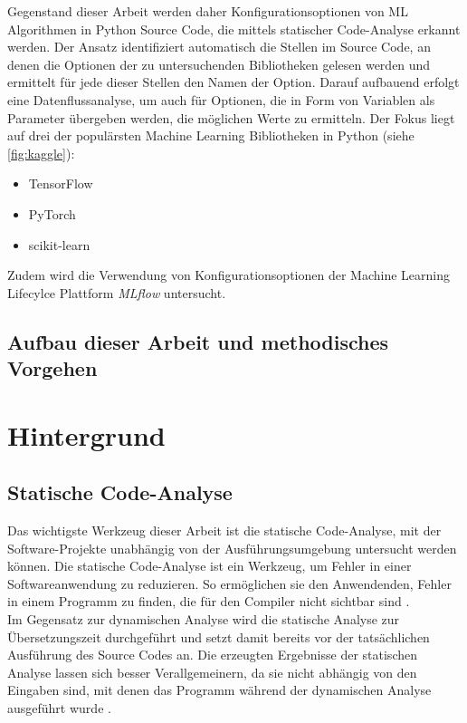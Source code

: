 \documentclass[german,bachelor]{swsLeipzig}
\begin{document}
Gegenstand dieser Arbeit werden daher Konfigurationsoptionen von ML Algorithmen in Python Source Code, die mittels statischer Code-Analyse erkannt werden.
Der Ansatz identifiziert automatisch die Stellen im Source Code, an denen die Optionen der zu untersuchenden Bibliotheken gelesen werden
und ermittelt für jede dieser Stellen den Namen der Option.
Darauf aufbauend erfolgt eine Datenflussanalyse, um auch für Optionen, die in Form von Variablen als Parameter übergeben werden,
die möglichen Werte zu ermitteln.
Der Fokus liegt auf drei der populärsten Machine Learning Bibliotheken in Python (siehe \autoref{fig:kaggle}):
\begin{itemize}
 \item TensorFlow
 \item PyTorch
 \item scikit-learn
\end{itemize}
Zudem wird die Verwendung von Konfigurationsoptionen der Machine Learning Lifecylce Plattform \textit{MLflow} untersucht. \\


\section{Aufbau dieser Arbeit und methodisches Vorgehen}

\chapter{Hintergrund}\label{Hintergrund}

\section{Statische Code-Analyse}
Das wichtigste Werkzeug dieser Arbeit ist die statische Code-Analyse,
mit der Software-Projekte unabhängig von der Ausführungsumgebung untersucht werden können.
Die statische Code-Analyse ist ein Werkzeug, um Fehler in einer Softwareanwendung zu reduzieren.
So ermöglichen sie den Anwendenden, Fehler in einem Programm zu finden, die für den Compiler nicht sichtbar sind \cite[]{bardas2010static}.\\

Im Gegensatz zur dynamischen Analyse wird die statische Analyse zur Übersetzungszeit durchgeführt
und setzt damit bereits vor der tatsächlichen Ausführung des Source Codes an.
Die erzeugten Ergebnisse der statischen Analyse lassen sich besser Verallgemeinern, da sie nicht abhängig von den Eingaben sind,
mit denen das Programm während der dynamischen Analyse ausgeführt wurde \cite[]{gomes2009overview}.\\
\end{document}
